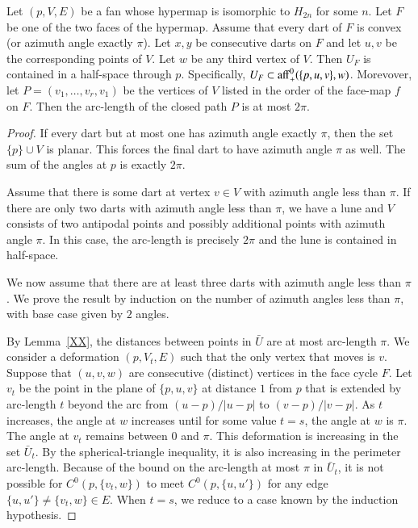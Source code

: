 \begin{lemma}\label{lemma:convex-hyper}  
Let $(p,V,E)$ be a fan whose hypermap is isomorphic
to $H_{2n}$ for some $n$.  Let $F$ be one of the two faces of the hypermap.  Assume
that every dart of $F$ is convex (or azimuth angle exactly $\pi$).  Let $x,y$
be consecutive darts on $F$ and let $u,v$ be the corresponding points of $V$.
Let $w$ be any third vertex of $V$.  Then $U_F$
is contained in
a half-space through $p$.  Specifically, $U_F\subset {\operatorname{aff}}_+^0(\{p,u,v\},w)$.
Morevover,
let $P=(v_1,\ldots,v_r,v_1)$ be the vertices of $V$ listed
in the order of the face-map $f$ on $F$.  Then the arc-length of the closed
path $P$ is at most $2\pi$.
\end{lemma}

\begin{proof}  If every dart but at most one 
has azimuth angle exactly $\pi$, then the set $\{p\}\cup V$ is
planar.  This forces the final dart to have azimuth angle $\pi$ as well. 
The sum of the angles at $p$ is exactly $2\pi$.

Assume that there is some dart at vertex $v\in V$ with azimuth angle less than $\pi$.
If there are only two darts with azimuth angle less than $\pi$, 
we have
a lune and $V$ consists of two antipodal points and possibly additional points
with azimuth angle $\pi$.  In this case, the arc-length
is precisely $2\pi$ and the lune is contained in half-space.

We now assume that there are at least three darts with azimuth angle less than $\pi$.
We prove the result by induction on the number of azimuth angles less than $\pi$,
with base case given by $2$ angles.

By Lemma~\ref{XX}, the distances between points in $\bar U$ are at most arc-length $\pi$.
We consider a deformation $(p,V_t,E)$ such that the only vertex that moves is
$v$.  Suppose that $(u,v,w)$ are consecutive (distinct) vertices in the face cycle $F$.
Let $v_t$ be the point in the plane of $\{p,u,v\}$ at distance $1$ from $p$ that
is extended by arc-length $t$ beyond the arc from $(u-p)/|u-p|$ to $(v-p)/|v-p|$.
As $t$ increases, the angle at $w$ increases until for some value $t=s$, the angle
at $w$ is $\pi$.  The angle at $v_t$ remains between $0$ and $\pi$.  This deformation
is increasing in the set $\bar U_t$.  By the spherical-triangle inequality, it is
also increasing in the perimeter arc-length.   Because of the bound on the arc-length
at most $\pi$ in $\bar U_t$, it is not possible for $C^0(p,\{v_t,w\})$ to meet
$C^0(p,\{u,u'\})$ for any edge $\{u,u'\}\ne\{v_t,w\}\in E$.   
When $t=s$, we reduce to a case known by the induction hypothesis.
\end{proof}






